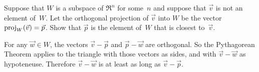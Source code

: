 \begin{exercises}
\item Suppose that $W$ is a subspace of $\Re^n$ for some~$n$ and suppose that
  $\vec{v}$ is not an element of~$W$.
  Let the orthogonal projection of $\vec{v}$ into $W$ be the vector
  $\proj{\vec{v}}{W}=\vec{p}$.
  Show that $\vec{p}$ is the element of~$W$ that is closest to~$\vec{v}$.
  \begin{answer}
    For any $\vec{w}\in W$, the vectors $\vec{v}-\vec{p}$ and
    $\vec{p}-\vec{w}$ are orthogonal.
    So the Pythagorean Theorem applies to the triangle with those vectors as
    sides, and with $\vec{v}-\vec{w}$ as hypoteneuse.
    Therefore $\vec{v}-\vec{w}$ is at least as long as $\vec{v}-\vec{p}$.
  \end{answer}

   





\end{exercises}
